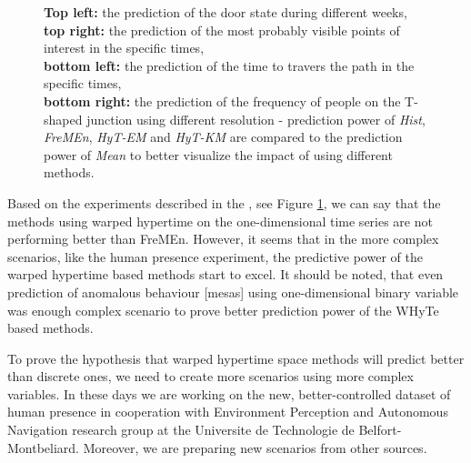 \begin{figure}[!b]
\begin{center}
{\textbf{Top left:} the prediction of the door state during different weeks,\\
\textbf{top right:} the prediction of the most probably visible points of interest in the specific times,\\
\textbf{bottom left:} the prediction of the time to travers the path in the specific times,\\
\textbf{bottom right:} the prediction of the frequency of people on the T-shaped junction using different resolution - prediction power of \textit{Hist}, \textit{FreMEn}, \textit{HyT-EM} and \textit{HyT-KM} are compared to the prediction power of \textit{Mean} to better visualize the impact of using different methods.
\label{fig:complexControl}}
   \end{center}
\end{figure}

Based on the experiments described in the \cite{krajnik2018warped}, see Figure \ref{fig:complexControl}, we can say that the methods using warped hypertime on the one-dimensional time series are not performing better than FreMEn.
However, it seems that in the more complex scenarios, like the human presence experiment, the predictive power of the warped hypertime based methods start to excel.
It should be noted, that even prediction of anomalous behaviour [mesas] using one-dimensional binary variable was
enough complex scenario to prove better prediction power of the WHyTe based methods.

To prove the hypothesis that warped hypertime space methods will predict better than discrete ones, we need to create more scenarios using more complex variables.
In these days we are working on the new, better-controlled dataset of human presence in cooperation with Environment Perception and Autonomous Navigation research group at the Universite de Technologie de Belfort-Montbeliard.
Moreover, we are preparing new scenarios from other sources.



